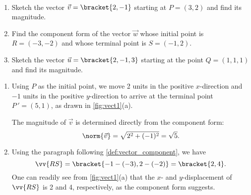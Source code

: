 \begin{example}\label{ex_vect1}
\mbox{}\\[-2\baselineskip]
\begin{enumerate}
	\item	Sketch the vector $\vec v=\bracket{2,-1}$ starting at $P=(3,2)$ and find its magnitude.
	\item	Find the component form of the vector $\vec w$ whose initial point is $R=(-3,-2)$ and whose terminal point is $S=(-1,2)$.
	\item	Sketch the vector $\vec u =\bracket{2,-1,3}$ starting at the point $Q = (1,1,1)$ and find its
magnitude.
\end{enumerate}
\solution
\begin{enumerate}
	\item Using $P$ as the initial point, we move 2 units in the positive $x$-direction and $-1$ units in the positive $y$-direction to arrive at the terminal point $P\,'=(5,1)$, as drawn in \autoref{fig:vect1}(a).
	
	The magnitude of $\vec v$ is determined directly from the component form:
	\[\norm{\vec v} =\sqrt{2^2+(-1)^2} = \sqrt{5}.\]
	
	\item	Using the paragraph following \autoref{def:vector_component}, we have
	\[\vv{RS} =\bracket{-1-(-3), 2-(-2)}=\bracket{2,4}.\]
	One can readily see from \autoref{fig:vect1}(a) that the $x$- and $y$-displacement of $\vv{RS}$ is 2 and 4, respectively, as the component form suggests.
	

\end{enumerate}
\end{example}
